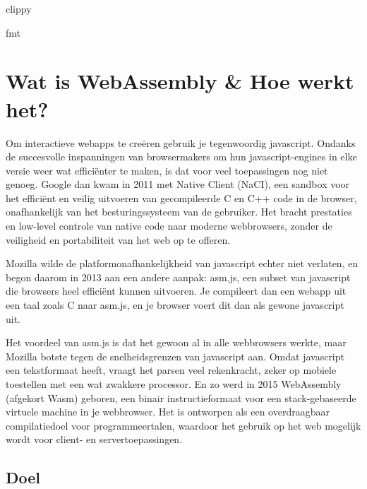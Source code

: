 clippy

fmt

\clearpage

\section{Wat is WebAssembly \& Hoe werkt het?}

Om interactieve webapps te creëren gebruik je tegenwoordig javascript. Ondanks de succesvolle
inspanningen van browsermakers om hun javascript-engines in elke versie weer wat efficiënter te
maken, is dat voor veel toepassingen nog niet genoeg. Google dan kwam in 2011 met Native Client
(NaCI), een sandbox voor het efficiënt en veilig uitvoeren van gecompileerde C en C++ code in de
browser, onafhankelijk van het besturingssysteem van de gebruiker. Het bracht prestaties en
low-level controle van native code naar moderne webbrowsers, zonder de veiligheid en portabiliteit
van het web op te offeren. \cite{native_client}

Mozilla wilde de platformonafhankelijkheid van javascript echter niet verlaten, en begon daarom in
2013 aan een andere aanpak: asm.js, een subset van javascript die browsers heel efficiënt kunnen
uitvoeren. Je compileert dan een webapp uit een taal zoals C naar asm.js, en je browser voert dit
dan als gewone javascript uit. 

Het voordeel van asm.js is dat het gewoon al in alle webbrowsers werkte, maar Mozilla botste tegen
de snelheidsgrenzen van javascript aan. Omdat javascript een tekstformaat heeft, vraagt het parsen
veel rekenkracht, zeker op mobiele toestellen met een wat zwakkere processor. En zo werd in 2015
WebAssembly (afgekort Wasm) geboren, een binair instructieformaat voor een stack-gebaseerde virtuele
machine in je webbrowser. Het is ontworpen als een overdraagbaar compilatiedoel voor
programmeertalen, waardoor het gebruik op het web mogelijk wordt voor client- en servertoepassingen.

\subsection{Doel}

